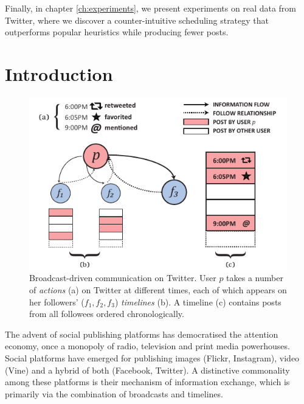 \documentclass[onesided,asymmetric]{tufte-book}
\begin{document}
Finally, in chapter \ref{ch:experiments}, we present experiments on real data from Twitter, where we discover a counter-intuitive scheduling strategy that outperforms popular heuristics while producing fewer posts.



\setlength{\parskip}{-3pc}
\tableofcontents
\setlength{\parskip}{\baselineskip}

\listoffigures

\listoftables

\mainmatter

\chapter{Introduction}

\begin{figure}%
  \includegraphics[width=\linewidth]{broadcasts}
  \caption[Broadcast-driven communication on Twitter.]{Broadcast-driven communication on Twitter. User $p$ takes a number of \textit{actions} (a) on Twitter at different times, each of which appears on her followers' ($f_1, f_2, f_3$) \textit{timelines} (b). A timeline (c) contains posts from all followees ordered chronologically.}
  \label{fig:broadcasts}
\end{figure}

The advent of social publishing platforms has democratised the attention economy, once a monopoly of radio, television and print media powerhouses. Social platforms have emerged for publishing images (Flickr, Instagram), video (Vine) and a hybrid of both (Facebook, Twitter). A distinctive commonality among these platforms is their mechanism of information exchange, which is primarily via the combination of broadcasts and timelines.
\end{document}
